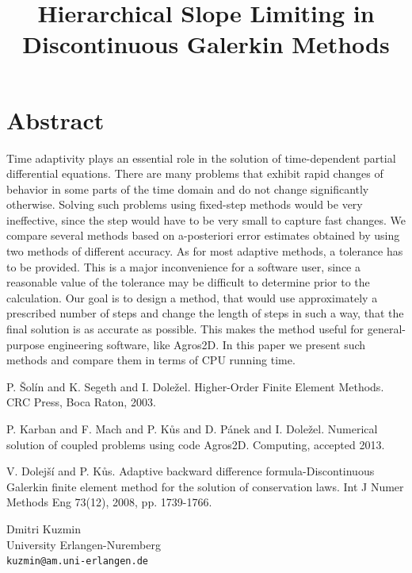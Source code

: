\documentclass[article,A4,11pt]{llncs}%
\begin{document}
\section*{Abstract}
Time adaptivity plays an essential role in the solution of time-dependent partial differential equations. There are many problems that exhibit rapid changes of behavior in some parts of the time domain and do not change significantly otherwise. Solving such problems using fixed-step methods would be very ineffective, since the step would have to be very small to capture fast changes. We compare several methods based on a-posteriori error estimates obtained by using two methods of different accuracy. As for most adaptive methods, a tolerance has to be provided. This is a major inconvenience for a software user, since a reasonable value of the tolerance may be difficult to determine prior to the calculation. Our goal is to design a method, that would use approximately a prescribed number of steps and change the length of steps in such a way, that the final solution is as accurate as possible. This makes the method useful for general-purpose engineering software, like Agros2D. In this paper we present such methods and compare them in terms of CPU running time.


\begin{thebibliography}{10}
{\sc P. Šolín and K. Segeth and I. Doležel}. {Higher-Order Finite Element Methods}. CRC Press, Boca Raton, 2003.

{\sc P. Karban and F. Mach and P. Kůs and D. Pánek and I. Doležel}. {Numerical solution of coupled problems using code Agros2D}. Computing, accepted 2013.

{\sc V. Dolejší and P. Kůs}. {Adaptive backward difference formula-Discontinuous Galerkin finite element method for the solution of conservation laws}. Int J Numer Methods Eng  73(12), 2008, pp. 1739-1766.
\end{thebibliography}

\title{Hierarchical Slope Limiting in  Discontinuous Galerkin Methods}
 \author{} \institute{}
\maketitle
\begin{center}
{\large Dmitri Kuzmin}\\
University Erlangen-Nuremberg\\
{\tt kuzmin@am.uni-erlangen.de}
\end{center}
\end{document}
